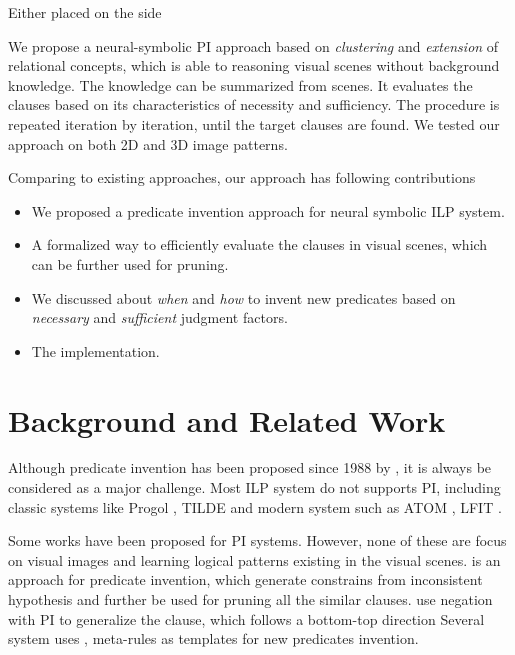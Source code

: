 \documentclass[
]{ceurart}
\begin{document}
Either placed on the side 


We propose a neural-symbolic PI approach based on \textit{clustering} and \textit{extension} of relational concepts, which is able to reasoning visual scenes without background knowledge. The knowledge can be summarized from scenes. It evaluates the clauses based on its characteristics of necessity and sufficiency. The procedure is repeated iteration by iteration, until the target clauses are found. We tested our approach on both 2D and 3D image patterns.

Comparing to existing approaches, our approach has following contributions

\begin{itemize}
	\item We proposed a predicate invention approach for neural symbolic ILP system.
	\item A formalized way to efficiently evaluate the clauses in visual scenes, which can be further used for pruning.
	\item We discussed about \textit{when} and \textit{how} to invent new predicates based on \textit{necessary} and \textit{sufficient} judgment factors.
	\item The implementation.
	
\end{itemize}





\section{Background and Related Work}

Although predicate invention has been proposed since 1988 by \cite{MUGGLETON1988339}, it is always be considered as a major challenge. Most ILP system do not supports PI, including classic systems like Progol \cite{Muggleton1995InverseEA}, TILDE\cite{BLOCKEEL1998285} and modern system such as ATOM \cite{atom}, LFIT \cite{LFIT}.

Some works have been proposed for PI systems. However, none of these are focus on visual images and learning logical patterns existing in the visual scenes. 
\cite{pilff} is an approach for predicate invention, which generate constrains from inconsistent hypothesis and further be used for pruning all the similar clauses. \cite{gtnpi} use negation with PI to generalize the clause, which follows a bottom-top direction 
Several system uses \cite{Evans2018}, \cite{kaminski_eiter_inoue_2018} meta-rules as templates for new predicates invention. 
\end{document}
